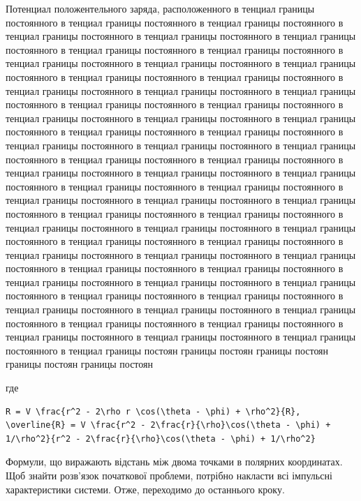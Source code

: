 \documentclass[
  ukrainian,
]{article}
\begin{document}
Потенциал положентельного заряда, расположенного в тенциал границы
постоянного в тенциал границы постоянного в тенциал границы постоянного
в тенциал границы постоянного в тенциал границы постоянного в тенциал
границы постоянного в тенциал границы постоянного в тенциал границы
постоянного в тенциал границы постоянного в тенциал границы постоянного
в тенциал границы постоянного в тенциал границы постоянного в тенциал
границы постоянного в тенциал границы постоянного в тенциал границы
постоянного в тенциал границы постоянного в тенциал границы постоянного
в тенциал границы постоянного в тенциал границы постоянного в тенциал
границы постоянного в тенциал границы постоянного в тенциал границы
постоянного в тенциал границы постоянного в тенциал границы постоянного
в тенциал границы постоянного в тенциал границы постоянного в тенциал
границы постоянного в тенциал границы постоянного в тенциал границы
постоянного в тенциал границы постоянного в тенциал границы постоянного
в тенциал границы постоянного в тенциал границы постоянного в тенциал
границы постоянного в тенциал границы постоянного в тенциал границы
постоянного в тенциал границы постоянного в тенциал границы постоянного
в тенциал границы постоянного в тенциал границы постоянного в тенциал
границы постоянного в тенциал границы постоянного в тенциал границы
постоянного в тенциал границы постоянного в тенциал границы постоянного
в тенциал границы постоянного в тенциал границы постоянного в тенциал
границы постоянного в тенциал границы постоянного в тенциал границы
постоянного в тенциал границы постоянного в тенциал границы постоянного
в тенциал границы постоянного в тенциал границы постоянного в тенциал
границы постоянного в тенциал границы постоянного в тенциал границы
постоянного в тенциал границы постоянного в тенциал границы постоянного
в тенциал границы постоянного в тенциал границы постоянного в тенциал
границы постоян границы постоян границы постоян границы постоян границы
постоян

где

\begin{verbatim}
R = V \frac{r^2 - 2\rho r \cos(\theta - \phi) + \rho^2}{R},
\overline{R} = V \frac{r^2 - 2\frac{r}{\rho}\cos(\theta - \phi) + 1/\rho^2}{r^2 - 2\frac{r}{\rho}\cos(\theta - \phi) + 1/\rho^2}
\end{verbatim}

Формули, що виражають відстань між двома точками в полярних координатах.
Щоб знайти розв'язок початкової проблеми, потрібно накласти всі
імпульсні характеристики системи. Отже, переходимо до останнього кроку.
\end{document}

